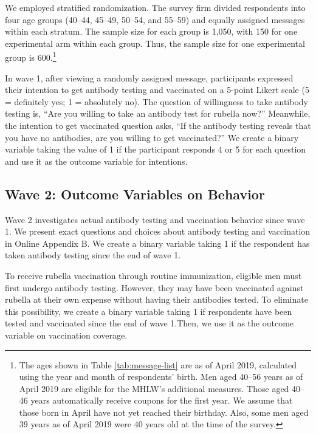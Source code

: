 \documentclass[
]{article}
\begin{document}
We employed stratified randomization. The survey firm divided respondents into four age groups (40--44, 45--49, 50--54, and 55--59) and equally assigned messages within each stratum. The sample size for each group is 1,050, with 150 for one experimental arm within each group. Thus, the sample size for one experimental group is 600.\footnote{The ages shown in Table \ref{tab:message-list} are as of April 2019, calculated using the year and month of respondents' birth. Men aged 40--56 years as of April 2019 are eligible for the MHLW's additional measures. Those aged 40--46 years automatically receive coupons for the first year. We assume that those born in April have not yet reached their birthday. Also, some men aged 39 years as of April 2019 were 40 years old at the time of the survey.}

In wave 1, after viewing a randomly assigned message, participants expressed their intention to get antibody testing and vaccinated on a 5-point Likert scale (5 = definitely yes; 1 = absolutely no). The question of willingness to take antibody testing is, ``Are you willing to take an antibody test for rubella now?'' Meanwhile, the intention to get vaccinated question asks, ``If the antibody testing reveals that you have no antibodies, are you willing to get vaccinated?'' We create a binary variable taking the value of 1 if the participant responds 4 or 5 for each question and use it as the outcome variable for intentions.

\hypertarget{wave2}{%
\subsection{Wave 2: Outcome Variables on Behavior}\label{wave2}}

Wave 2 investigates actual antibody testing and vaccination behavior since wave 1. We present exact questions and choices about antibody testing and vaccination in Online Appendix B. We create a binary variable taking 1 if the respondent has taken antibody testing since the end of wave 1.

To receive rubella vaccination through routine immunization, eligible men must first undergo antibody testing. However, they may have been vaccinated against rubella at their own expense without having their antibodies tested. To eliminate this possibility, we create a binary variable taking 1 if respondents have been tested and vaccinated since the end of wave 1.Then, we use it as the outcome variable on vaccination coverage.
\end{document}
